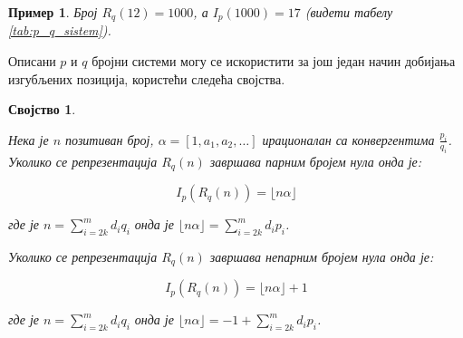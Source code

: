 \documentclass[a4paper]{article}
\newtheorem{example}{Пример}
\newtheorem{property}{Својство}
\begin{document}
\begin{example}
	Број $ R_{q}(12) = 1000 $, а $ I_{p}(1000) = 17 $ (видети табелу \ref{tab:p_q_sistem}).
\end{example}

Описани $ p $ и $ q $ бројни системи могу се искористити за још један начин добијања изгубљених позиција, користећи следећа својства.

\begin{property}
	\label{prop:r_q_nule}
	
	Нека је $ n $ позитиван број, $ \alpha = [1, a_{1}, a_{2}, \ldots] $ ирационалан са конвергентима $ {\frac{p_{i}}{q_{i}}} $. Уколико се репрезентација $ R_q(n) $ завршава парним бројем нула онда је:
	
	\begin{displaymath}
	I_{p}(R_q(n)) = \lfloor n \alpha \rfloor
	\end{displaymath}
	
	где је $ n = \sum_{i = 2k}^{m} d_{i}q_{i} $ онда је $ \lfloor n \alpha \rfloor = \sum_{i = 2k}^{m} d_{i}p_{i} $.
	
	Уколико се репрезентација $ R_q(n) $ завршава непарним бројем нула онда је: 
	
	\begin{displaymath}
	I_{p}(R_q(n)) = \lfloor n \alpha \rfloor + 1 
	\end{displaymath}
	
	где је $ n = \sum_{i = 2k}^{m} d_{i}q_{i} $ онда је $ \lfloor n \alpha \rfloor = -1 + \sum_{i = 2k}^{m} d_{i}p_{i} $.
	
\end{property}
\end{document}
